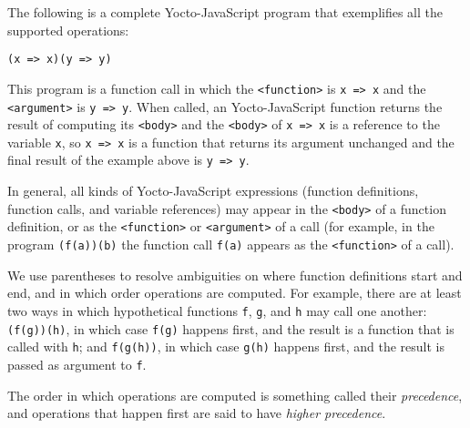 \documentclass[12pt, oneside]{book}
\begin{document}
The following is a complete Yocto-JavaScript program that exemplifies all the supported operations:

\begin{verbatim}
(x => x)(y => y)
\end{verbatim}

This program is a function call in which the \verb!<function>! is \texttt{x => x} and the \verb!<argument>! is \texttt{y => y}. When called, an Yocto-JavaScript function returns the result of computing its \verb!<body>! and the \verb!<body>! of \texttt{x => x} is a reference to the variable \texttt{x}, so \texttt{x => x} is a function that returns its argument unchanged and the final result of the example above is \texttt{y => y}.

In general, all kinds of Yocto-JavaScript expressions (function definitions, function calls, and variable references) may appear in the \verb!<body>! of a function definition, or as the \verb!<function>! or \verb!<argument>! of a call (for example, in the program \texttt{(f(a))(b)} the function call \texttt{f(a)} appears as the \verb!<function>! of a call).

We use parentheses to resolve ambiguities on where function definitions start and end, and in which order operations are computed. For example, there are at least two ways in which hypothetical functions \texttt{f}, \texttt{g}, and \texttt{h} may call one another: \texttt{(f(g))(h)}, in which case \texttt{f(g)} happens first, and the result is a function that is called with \texttt{h}; and \texttt{f(g(h))}, in which case \texttt{g(h)} happens first, and the result is passed as argument to \texttt{f}.

\begin{mdframed}[frametitle = {Technical Terms}]
The order in which operations are computed is something called their \emph{precedence}, and operations that happen first are said to have \emph{higher precedence}.
\end{mdframed}
\end{document}
